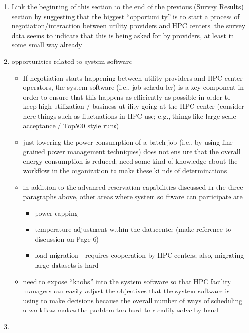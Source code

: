 \documentclass{llncs}
\begin{document}
\begin{enumerate}
\item Link the beginning of this section to the end of the previous (Survey Results) section by suggesting that the biggest ``opportuni
ty'' is to start a process of negotiation/interaction between utility providers and HPC centers; the survey data seems to indicate that
 this is being asked for by providers, at least in some small way already
\item opportunities related to system software
        \begin{itemize}
        \item If negotiation starts happening between utility providers and HPC center operators, the system software (i.e., job schedu
ler) is a key component in order to ensure that this happens as efficiently as possible in order to keep high utilization / business ut
ility going at the HPC center (consider here things such as fluctuations in HPC use; e.g., things like large-scale acceptance / Top500
style runs)
        \item just lowering the power consumption of a batch job (i.e., by using fine grained power management techniques) does not ens
ure that the overall energy consumption is reduced; need some kind of knowledge about the workflow in the organization to make these ki
nds of determinations
        \item in addition to the advanced reservation capabilities discussed in the three paragraphs above, other areas where system so
ftware can participate are
                \begin{itemize}
                \item power capping
                \item temperature adjustment within the datacenter (make reference to discussion on Page 6)
                \item load migration - requires cooperation by HPC centers; also, migrating large datasets is hard
                \end{itemize}
        \item need to expose ``knobs'' into the system software so that HPC facility managers can easily adjust the objectives that the
 system software is using to make decisions because the overall number of ways of scheduling a workflow makes the problem too hard to r
eadily solve by hand
        \end{itemize}
\item 
\end{enumerate}
\end{document}
